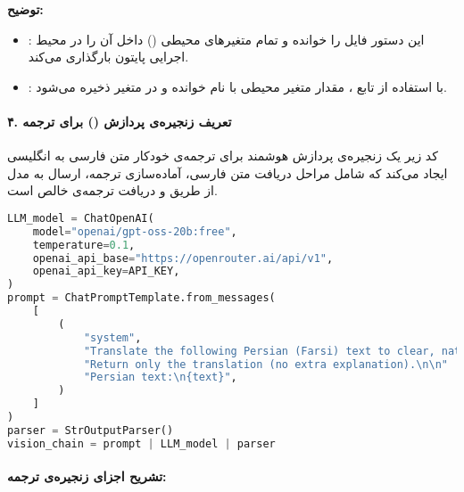 \documentclass{article}
\begin{document}
\textbf{توضیح:}
\begin{itemize}
    \item {}: این دستور فایل  را خوانده و تمام متغیرهای محیطی () داخل آن را در محیط اجرایی پایتون بارگذاری می‌کند.
    \item {}: با استفاده از تابع ، مقدار متغیر محیطی با نام  خوانده و در متغیر  ذخیره می‌شود.
\end{itemize}

\paragraph{۴. تعریف زنجیره‌ی پردازش () برای ترجمه}

کد زیر یک زنجیره‌ی پردازش هوشمند برای ترجمه‌ی خودکار متن فارسی به انگلیسی ایجاد می‌کند که شامل مراحل دریافت متن فارسی، آماده‌سازی  ترجمه، ارسال به مدل  از طریق  و دریافت ترجمه‌ی خالص است.

\begin{latin}
\begin{lstlisting}[language=Python]
LLM_model = ChatOpenAI(
    model="openai/gpt-oss-20b:free",
    temperature=0.1,
    openai_api_base="https://openrouter.ai/api/v1",
    openai_api_key=API_KEY,
)
prompt = ChatPromptTemplate.from_messages(
    [
        (
            "system",
            "Translate the following Persian (Farsi) text to clear, natural English.\n"
            "Return only the translation (no extra explanation).\n\n"
            "Persian text:\n{text}",
        )
    ]
)
parser = StrOutputParser()
vision_chain = prompt | LLM_model | parser
\end{lstlisting}
\end{latin}


\paragraph{تشریح اجزای زنجیره‌ی ترجمه:}
\end{document}
